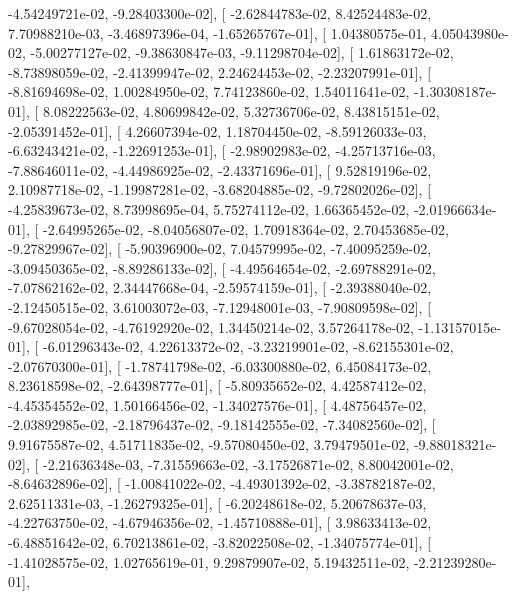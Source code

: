 \documentclass{article}
\begin{document}
         -4.54249721e-02,  -9.28403300e-02],
       [ -2.62844783e-02,   8.42524483e-02,   7.70988210e-03,
         -3.46897396e-04,  -1.65265767e-01],
       [  1.04380575e-01,   4.05043980e-02,  -5.00277127e-02,
         -9.38630847e-03,  -9.11298704e-02],
       [  1.61863172e-02,  -8.73898059e-02,  -2.41399947e-02,
          2.24624453e-02,  -2.23207991e-01],
       [ -8.81694698e-02,   1.00284950e-02,   7.74123860e-02,
          1.54011641e-02,  -1.30308187e-01],
       [  8.08222563e-02,   4.80699842e-02,   5.32736706e-02,
          8.43815151e-02,  -2.05391452e-01],
       [  4.26607394e-02,   1.18704450e-02,  -8.59126033e-03,
         -6.63243421e-02,  -1.22691253e-01],
       [ -2.98902983e-02,  -4.25713716e-03,  -7.88646011e-02,
         -4.44986925e-02,  -2.43371696e-01],
       [  9.52819196e-02,   2.10987718e-02,  -1.19987281e-02,
         -3.68204885e-02,  -9.72802026e-02],
       [ -4.25839673e-02,   8.73998695e-04,   5.75274112e-02,
          1.66365452e-02,  -2.01966634e-01],
       [ -2.64995265e-02,  -8.04056807e-02,   1.70918364e-02,
          2.70453685e-02,  -9.27829967e-02],
       [ -5.90396900e-02,   7.04579995e-02,  -7.40095259e-02,
         -3.09450365e-02,  -8.89286133e-02],
       [ -4.49564654e-02,  -2.69788291e-02,  -7.07862162e-02,
          2.34447668e-04,  -2.59574159e-01],
       [ -2.39388040e-02,  -2.12450515e-02,   3.61003072e-03,
         -7.12948001e-03,  -7.90809598e-02],
       [ -9.67028054e-02,  -4.76192920e-02,   1.34450214e-02,
          3.57264178e-02,  -1.13157015e-01],
       [ -6.01296343e-02,   4.22613372e-02,  -3.23219901e-02,
         -8.62155301e-02,  -2.07670300e-01],
       [ -1.78741798e-02,  -6.03300880e-02,   6.45084173e-02,
          8.23618598e-02,  -2.64398777e-01],
       [ -5.80935652e-02,   4.42587412e-02,  -4.45354552e-02,
          1.50166456e-02,  -1.34027576e-01],
       [  4.48756457e-02,  -2.03892985e-02,  -2.18796437e-02,
         -9.18142555e-02,  -7.34082560e-02],
       [  9.91675587e-02,   4.51711835e-02,  -9.57080450e-02,
          3.79479501e-02,  -9.88018321e-02],
       [ -2.21636348e-03,  -7.31559663e-02,  -3.17526871e-02,
          8.80042001e-02,  -8.64632896e-02],
       [ -1.00841022e-02,  -4.49301392e-02,  -3.38782187e-02,
          2.62511331e-03,  -1.26279325e-01],
       [ -6.20248618e-02,   5.20678637e-03,  -4.22763750e-02,
         -4.67946356e-02,  -1.45710888e-01],
       [  3.98633413e-02,  -6.48851642e-02,   6.70213861e-02,
         -3.82022508e-02,  -1.34075774e-01],
       [ -1.41028575e-02,   1.02765619e-01,   9.29879907e-02,
          5.19432511e-02,  -2.21239280e-01],
\end{document}
